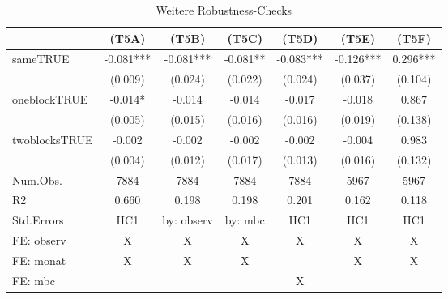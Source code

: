 \documentclass[
  a4paper,
  DIV=11,
  oneside]{scrreprt}
\newenvironment{Shaded}{\begin{snugshade}}{\end{snugshade}}
\newcommand{\AttributeTok}[1]{\textcolor[rgb]{0.40,0.45,0.13}{#1}}
\newcommand{\CommentTok}[1]{\textcolor[rgb]{0.37,0.37,0.37}{#1}}
\newcommand{\DecValTok}[1]{\textcolor[rgb]{0.68,0.00,0.00}{#1}}
\newcommand{\FunctionTok}[1]{\textcolor[rgb]{0.28,0.35,0.67}{#1}}
\newcommand{\NormalTok}[1]{\textcolor[rgb]{0.00,0.23,0.31}{#1}}
\newcommand{\OtherTok}[1]{\textcolor[rgb]{0.00,0.23,0.31}{#1}}
\newcommand{\SpecialCharTok}[1]{\textcolor[rgb]{0.37,0.37,0.37}{#1}}
\newcommand{\StringTok}[1]{\textcolor[rgb]{0.13,0.47,0.30}{#1}}
\begin{document}
\begin{Shaded}
\end{Shaded}

\begingroup
\fontsize{12.0pt}{14.4pt}\selectfont
\setlength{\LTpost}{0mm}

\begin{longtable}{lcccccc}

\caption{\label{tbl-pprobust}Weitere Robustness-Checks}

\tabularnewline

\toprule
  & (T5A) & (T5B) & (T5C) & (T5D) & (T5E) & (T5F) \\ 
\midrule\addlinespace[2.5pt]
sameTRUE & -0.081*** & -0.081*** & -0.081** & -0.083*** & -0.126*** & 0.296*** \\ 
 & (0.009) & (0.024) & (0.022) & (0.024) & (0.037) & (0.104) \\ 
oneblockTRUE & -0.014* & -0.014 & -0.014 & -0.017 & -0.018 & 0.867 \\ 
 & (0.005) & (0.015) & (0.016) & (0.016) & (0.019) & (0.138) \\ 
twoblocksTRUE & -0.002 & -0.002 & -0.002 & -0.002 & -0.004 & 0.983 \\ 
 & (0.004) & (0.012) & (0.017) & (0.013) & (0.016) & (0.132) \\ 
Num.Obs. & 7884 & 7884 & 7884 & 7884 & 5967 & 5967 \\ 
R2 & 0.660 & 0.198 & 0.198 & 0.201 & 0.162 & 0.118 \\ 
Std.Errors & HC1 & by: observ & by: mbc & HC1 & HC1 & HC1 \\ 
FE: observ & X & X & X & X & X & X \\ 
FE: monat & X & X & X &  & X & X \\ 
FE: mbc &  &  &  & X &  &  \\ 
\bottomrule

\end{longtable}
\end{document}

